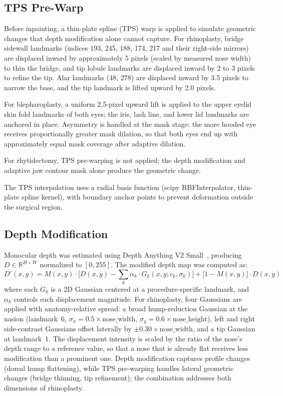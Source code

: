 \documentclass[runningheads]{llncs}
\begin{document}
\subsection{TPS Pre-Warp}

Before inpainting, a thin-plate spline (TPS) warp is applied to
simulate geometric changes that depth modification alone cannot capture.
For rhinoplasty, bridge sidewall landmarks (indices 193, 245, 188,
174, 217 and their right-side mirrors) are displaced inward by
approximately 5 pixels (scaled by measured nose width) to thin the
bridge, and tip lobule landmarks are displaced
inward by 2 to 3 pixels to refine the tip. Alar landmarks (48, 278)
are displaced inward by 3.5 pixels to narrow the base, and the tip
landmark is lifted upward by 2.0 pixels.

For blepharoplasty, a uniform 2.5-pixel upward lift is applied to the
upper eyelid skin fold landmarks of both eyes; the iris, lash line,
and lower lid landmarks are anchored in place. Asymmetry is handled
at the mask stage: the more hooded eye receives proportionally greater
mask dilation, so that both eyes end up with approximately equal
mask coverage after adaptive dilation.

For rhytidectomy, TPS pre-warping is not applied; the depth
modification and adaptive jaw contour mask alone produce the
geometric change.

The TPS interpolation uses a radial basis function
(scipy RBFInterpolator, thin-plate spline kernel),
with boundary anchor points to prevent deformation outside the
surgical region.

\subsection{Depth Modification}

Monocular depth was estimated using Depth Anything V2
Small~\cite{yang2024depth}, producing $D \in \mathbb{R}^{H \times W}$
normalized to $[0, 255]$. The modified depth map was computed as:
\begin{equation}
D'(x,y) = M(x,y) \cdot \bigl[D(x,y) - \sum_k \alpha_k \cdot
G_k(x,y; c_k, \sigma_k)\bigr]
+ \bigl[1 - M(x,y)\bigr] \cdot D(x,y)
\label{eq:depth_mod}
\end{equation}
where each $G_k$ is a 2D Gaussian centered at a procedure-specific
landmark, and $\alpha_k$ controls each displacement magnitude.
For rhinoplasty, four Gaussians are applied with anatomy-relative
spread: a broad hump-reduction Gaussian at the nasion (landmark~6,
$\sigma_x = 0.5 \times \text{nose\_width}$,
$\sigma_y = 0.6 \times \text{nose\_height}$), left and right
side-contrast Gaussians offset laterally by
$\pm 0.30 \times \text{nose\_width}$, and a tip Gaussian at
landmark~1. The displacement intensity is scaled by the ratio of the
nose's depth range to a reference value, so that a nose that is
already flat receives less modification than a prominent one. Depth modification captures profile changes (dorsal
hump flattening), while TPS pre-warping handles lateral geometric
changes (bridge thinning, tip refinement); the combination addresses
both dimensions of rhinoplasty.
\end{document}
